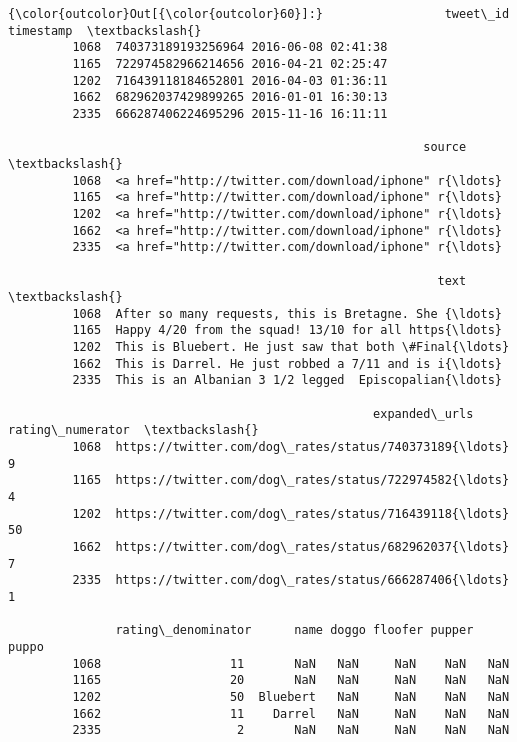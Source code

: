 \documentclass[11pt]{article}
\begin{document}
\begin{Verbatim}[commandchars=\\\{\}]
{\color{outcolor}Out[{\color{outcolor}60}]:}                 tweet\_id           timestamp  \textbackslash{}
         1068  740373189193256964 2016-06-08 02:41:38   
         1165  722974582966214656 2016-04-21 02:25:47   
         1202  716439118184652801 2016-04-03 01:36:11   
         1662  682962037429899265 2016-01-01 16:30:13   
         2335  666287406224695296 2015-11-16 16:11:11   
         
                                                          source  \textbackslash{}
         1068  <a href="http://twitter.com/download/iphone" r{\ldots}   
         1165  <a href="http://twitter.com/download/iphone" r{\ldots}   
         1202  <a href="http://twitter.com/download/iphone" r{\ldots}   
         1662  <a href="http://twitter.com/download/iphone" r{\ldots}   
         2335  <a href="http://twitter.com/download/iphone" r{\ldots}   
         
                                                            text  \textbackslash{}
         1068  After so many requests, this is Bretagne. She {\ldots}   
         1165  Happy 4/20 from the squad! 13/10 for all https{\ldots}   
         1202  This is Bluebert. He just saw that both \#Final{\ldots}   
         1662  This is Darrel. He just robbed a 7/11 and is i{\ldots}   
         2335  This is an Albanian 3 1/2 legged  Episcopalian{\ldots}   
         
                                                   expanded\_urls  rating\_numerator  \textbackslash{}
         1068  https://twitter.com/dog\_rates/status/740373189{\ldots}                 9   
         1165  https://twitter.com/dog\_rates/status/722974582{\ldots}                 4   
         1202  https://twitter.com/dog\_rates/status/716439118{\ldots}                50   
         1662  https://twitter.com/dog\_rates/status/682962037{\ldots}                 7   
         2335  https://twitter.com/dog\_rates/status/666287406{\ldots}                 1   
         
               rating\_denominator      name doggo floofer pupper puppo  
         1068                  11       NaN   NaN     NaN    NaN   NaN  
         1165                  20       NaN   NaN     NaN    NaN   NaN  
         1202                  50  Bluebert   NaN     NaN    NaN   NaN  
         1662                  11    Darrel   NaN     NaN    NaN   NaN  
         2335                   2       NaN   NaN     NaN    NaN   NaN  
\end{Verbatim}
            
\end{document}
